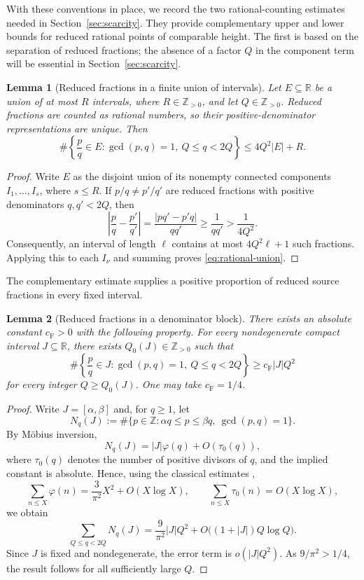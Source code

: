 \documentclass[11pt]{amsart}
\numberwithin{equation}{section}
\newtheorem{lemma}[lemma]{Lemma}
\theoremstyle{definition}
\theoremstyle{remark}
\newcommand{\R}{\mathbb R}
\newcommand{\Z}{\mathbb Z}
\newcommand{\abs}[1]{\left\lvert #1\right\rvert}
\newcommand{\set}[1]{\left\{#1\right\}}
\begin{document}
With these conventions in place, we record the two rational-counting
estimates needed in Section~\ref{sec:scarcity}. They provide complementary
upper and lower bounds for reduced rational points of comparable height.
The first is based on the separation of reduced fractions; the absence
of a factor $Q$ in the component term will be essential in Section~\ref{sec:scarcity}.

\begin{lemma}[Reduced fractions in a finite union of intervals]
\label{lem:rational-union}
Let $E\subseteq\R$ be a union of at most $R$ intervals, where
$R\in\Z_{>0}$, and let $Q\in\Z_{>0}$. Reduced fractions are counted as rational
numbers, so their positive-denominator representations are unique. Then
\begin{equation}\label{eq:rational-union}
\#\set{\frac pq\in E:\gcd(p,q)=1,\ Q\leq q<2Q}
\leq4Q^2|E|+R.
\end{equation}
\end{lemma}

\begin{proof}
Write $E$ as the disjoint union of its nonempty connected components
$I_1,\ldots,I_s$, where $s\leq R$. If $p/q\neq p'/q'$ are reduced
fractions with positive denominators $q,q'<2Q$, then
\[
\abs{\frac pq-\frac{p'}{q'}}
=
\frac{|pq'-p'q|}{qq'}
\geq\frac1{qq'}>\frac1{4Q^2}.
\]
Consequently, an interval of length $\ell$ contains at most
$4Q^2\ell+1$ such fractions. Applying this to each $I_\nu$ and
summing proves \eqref{eq:rational-union}.
\end{proof}

The complementary estimate supplies a positive proportion of reduced
source fractions in every fixed interval.

\begin{lemma}[Reduced fractions in a denominator block]
\label{lem:farey-lower-en}
There exists an absolute constant $c_{\mathrm F}>0$ with the following
property. For every nondegenerate compact interval $J\subseteq\R$,
there exists $Q_0(J)\in\Z_{>0}$ such that
\begin{equation}\label{eq:farey-lower-en}
\#\set{\frac pq\in J:\gcd(p,q)=1,\ Q\leq q<2Q}
\geq c_{\mathrm F}|J|Q^2
\end{equation}
for every integer $Q\geq Q_0(J)$. One may take
$c_{\mathrm F}=1/4$.
\end{lemma}

\begin{proof}
Write $J=[\alpha,\beta]$ and, for $q\ge1$, let
\[
N_q(J):=\#\{p\in\Z:\alpha q\le p\le\beta q,\ \gcd(p,q)=1\}.
\]
By M\"obius inversion,
\[
N_q(J)=|J|\varphi(q)+O(\tau_0(q)),
\]
where $\tau_0(q)$ denotes the number of positive
divisors of $q$, and the implied constant is absolute. Hence, using the classical estimates \cite{Apostol1976},
\[
\sum_{n\le X}\varphi(n)=\frac{3}{\pi^2}X^2+O(X\log X),
\qquad
\sum_{n\le X}\tau_0(n)=O(X\log X),
\]
we obtain
\[
\sum_{Q\le q<2Q}N_q(J)
=
\frac{9}{\pi^2}|J|Q^2
+O\bigl((1+|J|)Q\log Q\bigr).
\]
Since $J$ is fixed and nondegenerate, the error term is
$o(|J|Q^2)$. As $9/\pi^2>1/4$, the result follows for all
sufficiently large $Q$.
\end{proof}
\end{document}
